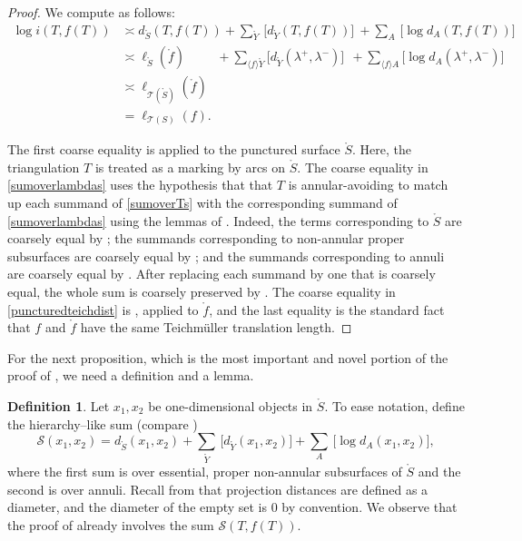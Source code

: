 \documentclass[11pt,letterpaper]{amsart}
\newcommand{\mc}{\mathcal}
\newcommand{\mr}{\mathring}
\newcommand{\teich}{\mathcal T}
\numberwithin{equation}{section}
\theoremstyle{definition}
\newtheorem{definition}[theorem]{Definition}
\newcommand{\C}{\mathcal{C}}
\begin{document}
\begin{proof}
We compute as follows:
\begin{align}
\log i(T, f(T))& \asymp d_{\mr S}(T, f(T)) + \sum_{\mr Y} \, \big[d_{\mr Y}(T, f(T))\big] \: +\sum_{A} \, \big[\log  d_{A}(T, f(T)) \big]
\label{sumoverTs} \\
& \asymp \ell_{\mr S}(\mr f) \qquad \:\: + \sum_{\langle f \rangle \mr Y}\big[d_{\mr Y}(\lambda^+,\lambda^-)\big] \:\: + \sum_{\langle f \rangle A} \big[\log d_A(\lambda^+,\lambda^-)\big] 
\label{sumoverlambdas} \\
& \asymp \ell_{\teich(\mr S)}(\mr f) 
\label{puncturedteichdist} \\
& = \ell_{\teich(S)}(f).
\end{align}

The first coarse equality is  applied to the punctured surface $\mr S$. Here, the triangulation $T$ is treated as a marking by arcs on $\mr S$. 
The coarse equality in \eqref{sumoverlambdas} uses 
the hypothesis that that $T$ is annular-avoiding
to match up each summand of \eqref{sumoverTs} with the corresponding summand of \eqref{sumoverlambdas} using the lemmas of . Indeed, the terms corresponding to $\mr S$ are coarsely equal by ; the summands corresponding to non-annular proper subsurfaces are coarsely equal by ; and the summands corresponding to annuli are coarsely equal by . After replacing each summand by one that is coarsely equal, the whole sum is coarsely preserved by  .
The coarse equality in \eqref{puncturedteichdist} is , applied to $\mr f$, and the last equality is the standard fact that $f$ and $\mr f$ have the same Teichm\"uller translation length.
\end{proof}

For the next proposition, which is the most important and novel portion of the proof of , we need a definition and a lemma.

\begin{definition}\label{Def:SSum}
 Let $x_1, x_2$ be one-dimensional objects in $\mr S$. To ease notation, define the hierarchy--like sum (compare )
\[
\mc S (x_1,x_2) = d_{\mr S}(x_1,x_2) + \sum_{\mr Y} \, \big[ d_{\mr Y}(x_1,x_2) \big] +\sum_{A} \, \big[ \log  d_{A}(x_1,x_2) \big],
\]
where the first sum is over essential, proper non-annular subsurfaces of $\mr S$ and the second is over annuli. 
Recall from  that projection distances are defined as a diameter, and the diameter of the empty set is $0$ by convention. 
We observe that the proof of 
 already involves the sum $\mc S(T, f(T))$.
\end{definition}
\end{document}
